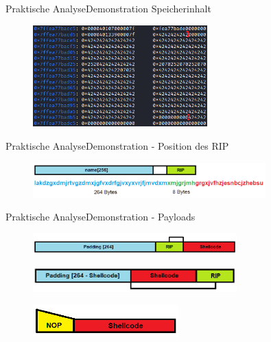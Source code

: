     \begin{frame}{Praktische Analyse}{Demonstration}
    \indent\hspace{7.1em}\large{Speicherinhalt}
    \begin{figure}[h]
        \centering
        \includegraphics[width=0.6\textwidth,height=0.75\textheight,keepaspectratio]{images/buffer.png}
    \end{figure}
\end{frame}

\begin{frame}{Praktische Analyse}{Demonstration - Position des RIP}
    \begin{figure}[h]
        \centering
        \includegraphics[width=0.8\textwidth,height=0.75\textheight,keepaspectratio]{images/characters.png}
    \end{figure}
\end{frame}

\begin{frame}{Praktische Analyse}{Demonstration - Payloads}
    \begin{figure}[h]
        \centering
        \includegraphics[width=0.7\textwidth,height=0.75\textheight,keepaspectratio]{images/payload1.png}
    \end{figure}
    \begin{figure}[h]
        \centering
        \includegraphics[width=0.7\textwidth,height=0.75\textheight,keepaspectratio]{images/payload2.png}
    \end{figure}
    \begin{figure}[h]
        \centering
        \includegraphics[width=0.5\textwidth,height=0.75\textheight,keepaspectratio]{images/nop.png}
    \end{figure}
\end{frame}

